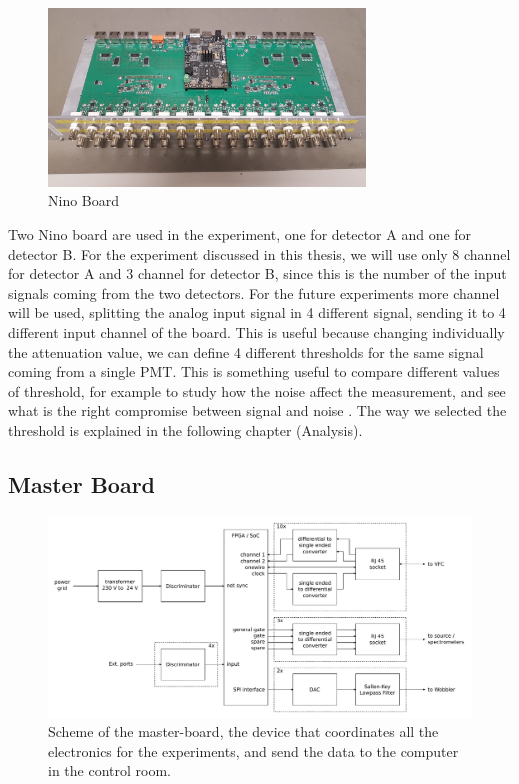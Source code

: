 \begin{figure}[hbtp]
\centering
\includegraphics[width = 0.75\textwidth]{ExperimentalSetup/NINO.jpg}
\caption{Nino Board}
\label{fig:NinoBoard}
\end{figure}

Two Nino board are used in the experiment, one for detector A and one for detector B. For the experiment discussed in this thesis, we will use only 8 channel for detector A and 3 channel for detector B, since this is the number of the input signals coming from the two detectors. For the future experiments more channel will be used, splitting the analog input signal in 4 different signal, sending it to 4 different input channel of the board. This is useful because changing individually the attenuation value, we can define 4 different thresholds for the same signal coming from a single PMT. This is something useful to compare different values of threshold, for example to study how the noise affect the measurement, and see what is the right compromise between signal and noise  .
The way we selected the threshold is explained in the following chapter (Analysis).

\subsection{Master Board}

\begin{figure}[hbtp]

\centering
\includegraphics[width = \textwidth]{ExperimentalSetup/masterboard.pdf}
\caption{Scheme of the master-board, the device that coordinates all the electronics for the experiments, and send the data to the computer in the control room.}
\end{figure}

